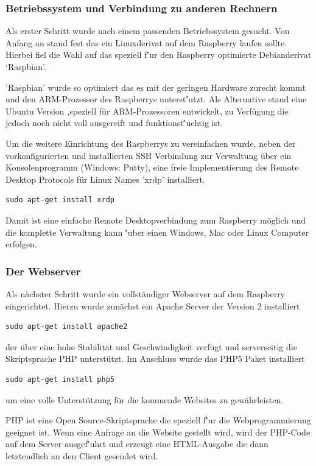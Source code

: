 \documentclass[11pt,a4paper]{article} %
\begin{document}
\subsubsection{Betriebssystem und Verbindung zu anderen Rechnern}
Als erster Schritt wurde nach einem passenden Betriebssystem gesucht. Von Anfang an stand fest das ein Linuxderivat auf dem Raspberry laufen sollte. Hierbei fiel die Wahl auf das speziell f\''ur den Raspberry optimierte Debianderivat `Raspbian'.
\par
'Raspbian' wurde so optimiert das es mit der geringen Hardware zurecht kommt und den ARM-Prozessor des Raspberrys unterst\''utzt. Als Alternative stand eine Ubuntu Version ,speziell f\"ur ARM-Prozessoren entwickelt, zu Verf\"ugung die jedoch noch nicht voll ausgereift und funktionst\''uchtig ist.
\par
 Um die weitere Einrichtung des Raspberrys zu vereinfachen wurde, neben der vorkonfigurierten und installierten SSH Verbindung zur Verwaltung \"uber ein Konsolenprogramm (Windows: Putty), eine freie Implementierung des Remote Desktop Protocols f\"ur Linux Names 'xrdp' installiert. \cite{berry1}
\begin{frame}

\begin{lstlisting}
sudo apt-get install xrdp
\end{lstlisting}

\end{frame}
Damit ist eine einfache Remote Desktopverbindung zum Raspberry m\"oglich und die komplette Verwaltung kann \''uber einen Windows, Mac oder Linux Computer erfolgen. 
\par
\subsubsection{Der Webserver}
Als n\"achster Schritt wurde ein vollst\"andiger Webserver auf dem Raspberry eingerichtet. Hierzu wurde zun\"achst ein Apache Server der Version 2 installiert
\begin{frame}

\begin{lstlisting}
sudo apt-get install apache2
\end{lstlisting}

\end{frame}
 der \"uber eine hohe Stabilit\"at und Geschwindigkeit verf\"ugt und serverseitig die Skriptsprache PHP unterst\"utzt. Im Anschluss wurde das PHP5 Paket installiert
 \begin{frame}

\begin{lstlisting}
sudo apt-get install php5
\end{lstlisting}

\end{frame}
 um eine volle Unterst\"utzung f\"ur die kommende Websites zu gew\"ahrleisten.
 \cite{berry2}
 \par
 PHP ist eine Open Source-Skriptsprache die speziell f\''ur die Webprogrammierung geeignet ist. Wenn eine Anfrage an die Website gestellt wird, wird der PHP-Code auf dem Server ausgef\''uhrt und erzeugt eine HTML-Ausgabe die dann letztendlich an den Client gesendet wird.
 \cite{berry3}
\par
\end{document}
